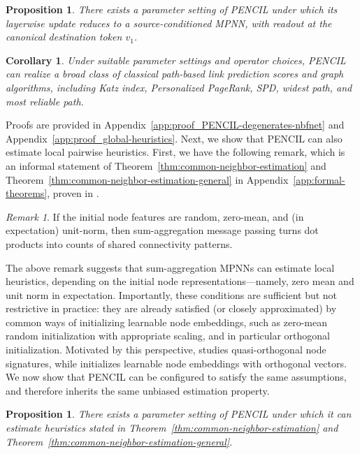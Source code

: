 \documentclass{article}
\theoremstyle{plain}
\newtheorem{proposition}[theorem]{Proposition}
\newtheorem{corollary}[theorem]{Corollary}
\theoremstyle{definition}
\theoremstyle{remark}
\newtheorem{remark}[theorem]{Remark}
\begin{document}
\begin{proposition}
    \label{prop:PENCIL-degenerates-nbfnet}
    There exists a parameter setting of PENCIL under which its layerwise update reduces to a source-conditioned MPNN, with readout at the canonical destination token \(v_1\).
\end{proposition}

\begin{corollary} \label{cor:global-heuristics}
    Under suitable parameter settings and operator choices, PENCIL can realize a broad class of classical path-based link prediction scores and graph algorithms, including Katz index, Personalized PageRank, SPD, widest path, and most reliable path.
\end{corollary}

Proofs are provided in Appendix~\ref{app:proof_PENCIL-degenerates-nbfnet} and Appendix~\ref{app:proof_global-heuristics}. Next, we show that PENCIL can also estimate local pairwise heuristics. First, we have the following remark, which is an informal statement of Theorem~\ref{thm:common-neighbor-estimation} and Theorem~\ref{thm:common-neighbor-estimation-general} in Appendix~\ref{app:formal-theorems}, proven in \cite{dong_pure_2024}.

\begin{remark} \label{remark:dot-products}
    If the initial node features are random, zero-mean, and (in expectation) unit-norm, then sum-aggregation message passing turns dot products into counts of shared connectivity patterns.
\end{remark}


The above remark suggests that sum-aggregation MPNNs can estimate local heuristics, depending on the initial node representations---namely, zero mean and unit norm in expectation. Importantly, these conditions are sufficient but not restrictive in practice: they are already satisfied (or closely approximated) by common ways of initializing learnable node embeddings, such as zero-mean random initialization with appropriate scaling, and in particular orthogonal initialization. Motivated by this perspective, \cite{dong_pure_2024} studies quasi-orthogonal node signatures, while \cite{ma_reconsidering_2025} initializes learnable node embeddings with orthogonal vectors. We now show that PENCIL can be configured to satisfy the same assumptions, and therefore inherits the same unbiased estimation property.

\begin{proposition} \label{prop:local-heuristics}
    There exists a parameter setting of PENCIL under which it can estimate heuristics stated in Theorem~\ref{thm:common-neighbor-estimation} and Theorem~\ref{thm:common-neighbor-estimation-general}.
\end{proposition}
\end{document}
